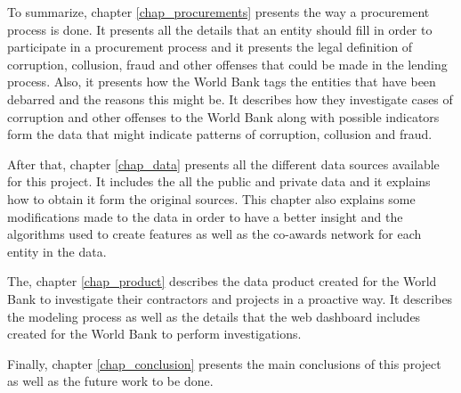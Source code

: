 To summarize, chapter \ref{chap_procurements} presents the way a procurement process is done. It presents all the details that an entity should fill in order to participate in a procurement process and it presents the legal definition of corruption, collusion, fraud and other offenses that could be made in the lending process. Also, it presents how the World Bank tags the entities that have been debarred and the reasons this might be. It describes how they investigate cases of corruption and other offenses to the World Bank along with possible indicators form the data that might indicate patterns of corruption, collusion and fraud.

After that, chapter \ref{chap_data} presents all the different data sources available for this project. It includes the all the public and private data and it explains how to obtain it form the original sources. This chapter also explains some modifications made to the data in order to have a better insight and the algorithms used to create features as well as the co-awards network for each entity in the data.

The, chapter \ref{chap_product} describes the data product created for the World Bank to investigate their contractors and projects in a proactive way. It describes the modeling process as well as the details that the web dashboard includes created for the World Bank to perform investigations.

Finally, chapter \ref{chap_conclusion} presents the main conclusions of this project as well as the future work to be done.





